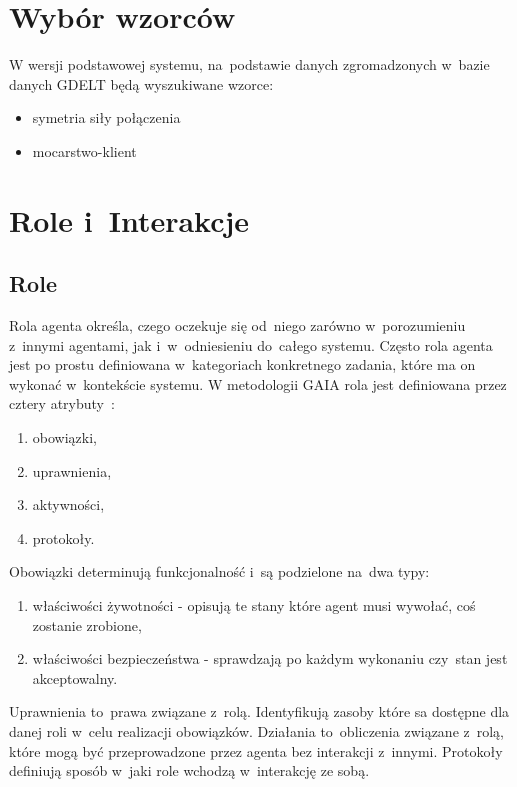 \documentclass[11pt]{report}
\begin{document}
    \section{Wybór wzorców}\label{sec:wybór-wzorców}


    W wersji podstawowej systemu, na~podstawie danych zgromadzonych w~bazie danych GDELT będą wyszukiwane wzorce:
    \begin{itemize}
        \item symetria siły połączenia
        \item mocarstwo-klient
    \end{itemize}


    \section{Role i~Interakcje}

    \subsection{Role}
    Rola agenta określa, czego oczekuje się od~niego zarówno w~porozumieniu z~innymi agentami, jak i~w~odniesieniu do~całego systemu.
    Często rola agenta jest po prostu definiowana w~kategoriach konkretnego zadania, które ma on wykonać w~kontekście systemu.
    W metodologii GAIA rola jest definiowana przez cztery atrybuty~\cite{Wooldridge2000a}:
    \begin{enumerate}
        \item obowiązki,
        \item uprawnienia,
        \item aktywności,
        \item protokoły.
    \end{enumerate}
    Obowiązki determinują funkcjonalność i~są podzielone na~dwa typy:
    \begin{enumerate}
        \item właściwości żywotności - opisują te stany które agent musi wywołać, coś zostanie zrobione,
        \item właściwości bezpieczeństwa - sprawdzają po każdym wykonaniu czy~stan jest akceptowalny.
    \end{enumerate}
    Uprawnienia to~prawa związane z~rolą.
    Identyfikują zasoby które sa dostępne dla danej roli w~celu realizacji obowiązków.
    Działania to~obliczenia związane z~rolą, które mogą być przeprowadzone przez agenta bez interakcji z~innymi.
    Protokoły definiują sposób w~jaki role wchodzą w~interakcję ze sobą.
\end{document}

